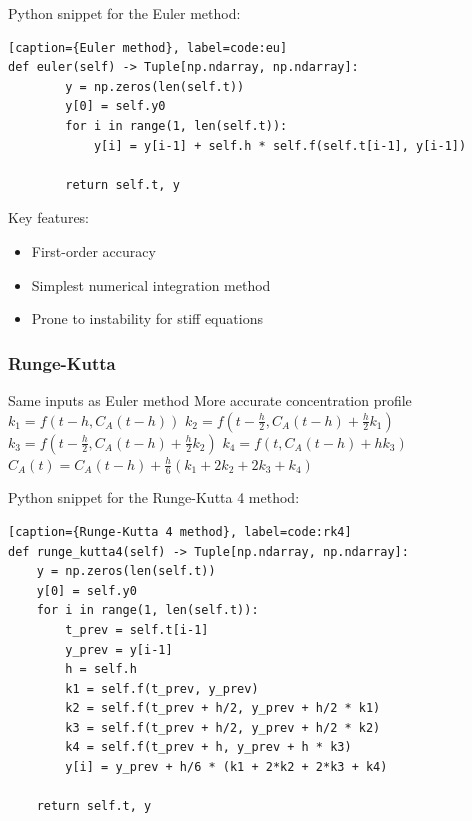 \documentclass[10pt]{article}
\begin{document}
Python snippet for the Euler method:
\begin{lstlisting}[style=custompython][caption={Euler method}, label=code:eu]
def euler(self) -> Tuple[np.ndarray, np.ndarray]:
        y = np.zeros(len(self.t))
        y[0] = self.y0
        for i in range(1, len(self.t)):
            y[i] = y[i-1] + self.h * self.f(self.t[i-1], y[i-1])
            
        return self.t, y
\end{lstlisting}


Key features:
\begin{itemize}
    \item First-order accuracy
    \item Simplest numerical integration method
    \item Prone to instability for stiff equations
\end{itemize}


\subsubsection{Runge-Kutta}
\begin{algorithm}[H]
\caption{4th Order Runge-Kutta Method}
\begin{algorithmic}[1]
\Require Same inputs as Euler method
\Ensure More accurate concentration profile
    \State \( k_1 = f(t - h, C_A(t - h)) \)
    \State \( k_2 = f(t - \frac{h}{2}, C_A(t - h) + \frac{h}{2}k_1) \)
    \State \( k_3 = f(t - \frac{h}{2}, C_A(t - h) + \frac{h}{2}k_2) \)
    \State \( k_4 = f(t, C_A(t - h) + hk_3) \)
    \State \( C_A(t) = C_A(t - h) + \frac{h}{6}(k_1 + 2k_2 + 2k_3 + k_4) \)
\EndFor
\end{algorithmic}
\end{algorithm}

Python snippet for the Runge-Kutta 4 method:
\begin{lstlisting}[style=custompython][caption={Runge-Kutta 4 method}, label=code:rk4]
def runge_kutta4(self) -> Tuple[np.ndarray, np.ndarray]:
    y = np.zeros(len(self.t))
    y[0] = self.y0
    for i in range(1, len(self.t)):
        t_prev = self.t[i-1]
        y_prev = y[i-1]
        h = self.h
        k1 = self.f(t_prev, y_prev)
        k2 = self.f(t_prev + h/2, y_prev + h/2 * k1)
        k3 = self.f(t_prev + h/2, y_prev + h/2 * k2)
        k4 = self.f(t_prev + h, y_prev + h * k3)
        y[i] = y_prev + h/6 * (k1 + 2*k2 + 2*k3 + k4)
        
    return self.t, y
\end{lstlisting}
\end{document}
